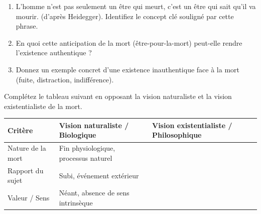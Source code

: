 \documentclass[11pt]{article}
\begin{document}
\begin{exercice}
\begin{enumerate}
    \item \og L'homme n'est pas seulement un être qui meurt, c'est un être qui sait qu'il va mourir. \fg (d'après Heidegger). Identifiez le concept clé souligné par cette phrase.
    \item En quoi cette \og anticipation de la mort \fg (être-pour-la-mort) peut-elle rendre l'existence \og authentique \fg ?
    \item Donnez un exemple concret d'une existence \og inauthentique \fg face à la mort (fuite, distraction, indifférence).
\end{enumerate}
\end{exercice}

\begin{exercice}
Complétez le tableau suivant en opposant la vision \og naturaliste \fg et la vision \og existentialiste \fg de la mort.

\begin{tabular}{|p{3.5cm}|p{5.5cm}|p{5.5cm}|}
\hline
\textbf{Critère} & \textbf{Vision naturaliste / Biologique} & \textbf{Vision existentialiste / Philosophique} \\
\hline
Nature de la mort & Fin physiologique, processus naturel &  \\
\hline
Rapport du sujet & Subi, événement extérieur &  \\
\hline
Valeur / Sens & Néant, absence de sens intrinsèque &  \\
\hline
\end{tabular}
\end{exercice}
\end{document}
